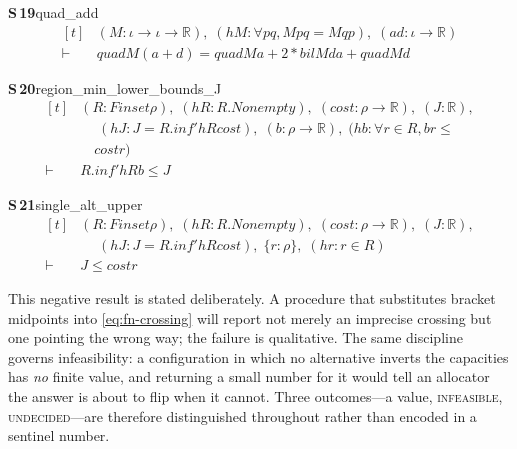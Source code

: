 \documentclass[conference]{IEEEtran}
\theoremstyle{definition}
\newcommand{\lean}[1]{\textsf{\footnotesize #1}}
\begin{document}
\noindent\textbf{S\,19}\quad\lean{quad\_add}
{\footnotesize\[ \begin{aligned}[t]
&(\mathit{M} : \iota \to \iota \to \mathbb{R} ),\; (\mathit{hM} : \forall \mathit{p} \mathit{q}, \mathit{M} \mathit{p} \mathit{q} = \mathit{M} \mathit{q} \mathit{p}),\; (\mathit{a} \mathit{d} : \iota \to \mathbb{R} )\\
\vdash\;&\mathit{quad} \mathit{M} (\mathit{a} + \mathit{d}) = \mathit{quad} \mathit{M} \mathit{a} + 2 * \mathit{bil} \mathit{M} \mathit{d} \mathit{a} + \mathit{quad} \mathit{M} \mathit{d}
\end{aligned} \]}

\noindent\textbf{S\,20}\quad\lean{region\_min\_lower\_bounds\_J}
{\footnotesize\[ \begin{aligned}[t]
&(\mathit{R} : \mathit{Finset} \rho ),\; (\mathit{hR} : \mathit{R}.\mathit{Nonempty}),\; (\mathit{cost} : \rho \to \mathbb{R} ),\; (\mathit{J} : \mathbb{R} ),\\
&\quad \; (\mathit{hJ} : \mathit{J} = \mathit{R}.\mathit{inf'} \mathit{hR} \mathit{cost}),\; (\mathit{b} : \rho \to \mathbb{R} ),\; (\mathit{hb} : \forall \mathit{r} \in \mathit{R}, \mathit{b} \mathit{r} \leq\\
&\quad \mathit{cost} \mathit{r})\\
\vdash\;&\mathit{R}.\mathit{inf'} \mathit{hR} \mathit{b} \leq \mathit{J}
\end{aligned} \]}

\noindent\textbf{S\,21}\quad\lean{single\_alt\_upper}
{\footnotesize\[ \begin{aligned}[t]
&(\mathit{R} : \mathit{Finset} \rho ),\; (\mathit{hR} : \mathit{R}.\mathit{Nonempty}),\; (\mathit{cost} : \rho \to \mathbb{R} ),\; (\mathit{J} : \mathbb{R} ),\\
&\quad \; (\mathit{hJ} : \mathit{J} = \mathit{R}.\mathit{inf'} \mathit{hR} \mathit{cost}),\; \{ \mathit{r} : \rho \},\; (\mathit{hr} : \mathit{r} \in \mathit{R})\\
\vdash\;&\mathit{J} \leq \mathit{cost} \mathit{r}
\end{aligned} \]}


This negative result is stated deliberately. A procedure that substitutes bracket midpoints
into \eqref{eq:fn-crossing} will report not merely an imprecise crossing but one pointing the
wrong way; the failure is qualitative. The same discipline governs infeasibility: a
configuration in which no alternative inverts the capacities has \emph{no} finite value, and
returning a small number for it would tell an allocator the answer is about to flip when it
cannot. Three outcomes---a value, \textsc{infeasible}, \textsc{undecided}---are therefore
distinguished throughout rather than encoded in a sentinel number.
\end{document}
